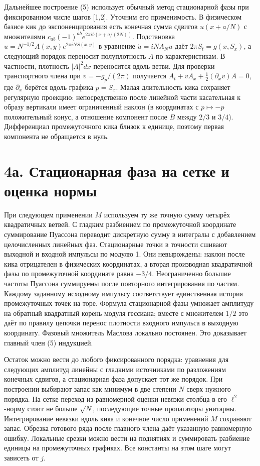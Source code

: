 \documentclass[11pt,a4paper]{article}
\newcommand{\sect}[1]{\section*{\sffamily\color{ink}#1}}
\begin{document}
Дальнейшее построение (5) использует обычный метод стационарной фазы при фиксированном числе шагов [1,2]. Уточним его применимость. В физическом базисе кик до экспоненцирования есть конечная сумма сдвигов $u(x+a/N)$ с множителями $c_{ab}(-1)^{ab}e^{2\pi ib(x+a/(2N))}$. Подстановка $u=N^{-1/2}A(x,y)e^{2\pi iN S(x,y)}$ в уравнение $\dot u=iN A_N u$ даёт $2\pi S_t=g(x,S_x)$, а следующий порядок переносит полуплотность $A$ по характеристикам. В частности, плотность $|A|^2dx$ переносится вдоль ветви. Для проверки транспортного члена при $v=-g_p/(2\pi)$ получается $A_t+v A_x+\frac12(\partial_xv) A=0$, где $\partial_x$ берётся вдоль графика $p=S_x$. Малая длительность кика сохраняет регулярную проекцию: непосредственно после линейной части касательная к образу вертикали имеет ограниченный наклон (в координатах с $p\mapsto-p$ положительный конус, а отношение компонент после $B$ между $2/3$ и $3/4$). Дифференциал промежуточного кика близок к единице, поэтому первая компонента не обращается в нуль.
\newpage
\sect{4а. Стационарная фаза на сетке и оценка нормы}
При следующем применении $M$ используем ту же точную сумму четырёх квадратичных ветвей. С гладким разбиением по промежуточной координате суммирование Пуассона переводит дискретную сумму в интегралы с добавлением целочисленных линейных фаз. Стационарные точки в точности сшивают выходной и входной импульсы по модулю 1. Они невырождены: наклон после кика отрицателен в физических координатах, а вторая производная квадратичной фазы по промежуточной координате равна $-3/4$. Неограниченно большие частоты Пуассона суммируемы после повторного интегрирования по частям. Каждому заданному исходному импульсу соответствует единственная история промежуточных точек на торе. Формула стационарной фазы умножает амплитуду на обратный квадратный корень модуля гессиана; вместе с множителем $1/2$ это даёт по правилу цепочки перенос плотности входного импульса в выходную координату. Фазовый множитель Маслова локально постоянен. Это доказывает главный член (5) индукцией.

Остаток можно вести до любого фиксированного порядка: уравнения для следующих амплитуд линейны с гладкими источниками по разложениям конечных сдвигов, а стационарная фаза допускает тот же порядок. При построении выбирают запас как минимум в две степени $N$ сверх нужного порядка. На сетке переход из равномерной оценки невязки столбца в его $\ell^2$-норму стоит не больше $\sqrt N$, последующие точные пропагаторы унитарны. Интегрирование невязки вдоль кика и конечное число применений $M$ сохраняют запас. Обрезка готового ряда после главного члена даёт указанную равномерную ошибку. Локальные срезки можно вести на поднятиях и суммировать разбиение единицы на промежуточных графиках. Все константы на этом шаге могут зависеть от $j$.
\end{document}
